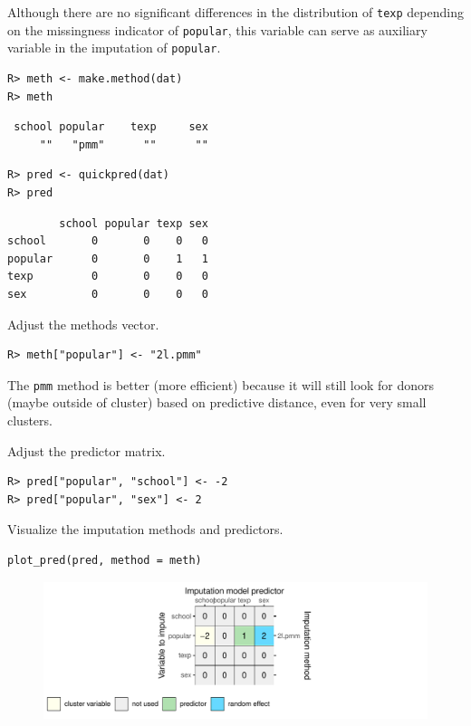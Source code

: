 \documentclass[
  article]{jss}
\begin{document}
Although there are no significant differences in the distribution of
\texttt{texp} depending on the missingness indicator of
\texttt{popular}, this variable can serve as auxiliary variable in the
imputation of \texttt{popular}.

\begin{verbatim}
R> meth <- make.method(dat)
R> meth
\end{verbatim}

\begin{verbatim}
 school popular    texp     sex 
     ""   "pmm"      ""      "" 
\end{verbatim}

\begin{verbatim}
R> pred <- quickpred(dat)
R> pred
\end{verbatim}

\begin{verbatim}
        school popular texp sex
school       0       0    0   0
popular      0       0    1   1
texp         0       0    0   0
sex          0       0    0   0
\end{verbatim}

Adjust the methods vector.

\begin{verbatim}
R> meth["popular"] <- "2l.pmm"
\end{verbatim}

The \texttt{pmm} method is better (more efficient) because it will still
look for donors (maybe outside of cluster) based on predictive distance,
even for very small clusters.

Adjust the predictor matrix.

\begin{verbatim}
R> pred["popular", "school"] <- -2
R> pred["popular", "sex"] <- 2
\end{verbatim}

Visualize the imputation methods and predictors.

\begin{verbatim}
plot_pred(pred, method = meth)
\end{verbatim}

\begin{figure}[h]

{\centering \includegraphics{manuscript_files/figure-pdf/unnamed-chunk-17-1.pdf}

}

\end{figure}
\end{document}
